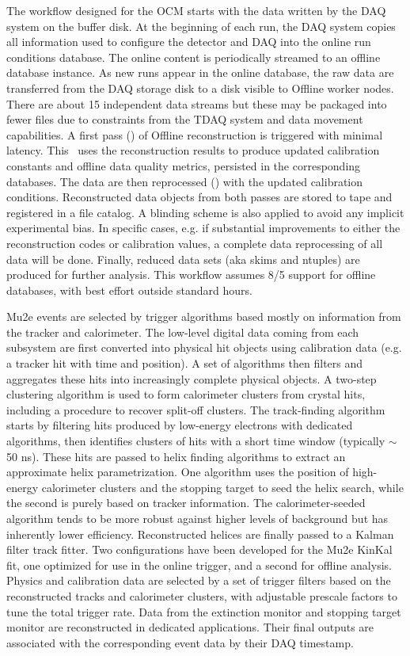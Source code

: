 The workflow designed for the OCM starts with the data written by the DAQ system on the buffer disk. At the beginning of each run, the DAQ system copies all information used to configure the detector and DAQ into the online run conditions database. The online content is periodically streamed to an offline database instance. As new runs appear in the online database, the raw data are transferred from the DAQ storage disk to a disk visible to Offline worker nodes. There are about 15 independent data streams but these may be packaged into fewer files due to constraints from the TDAQ system and data movement capabilities. A first pass (\passone) of Offline reconstruction is triggered with minimal latency. This \passone\ uses the reconstruction results to produce updated calibration constants and offline data quality metrics, persisted in the corresponding databases. The data are then reprocessed (\passtwo) with the updated calibration conditions. Reconstructed data objects from both passes are stored to tape and registered in a file catalog. A blinding scheme is also applied to avoid any implicit experimental bias. In specific cases, e.g. if substantial improvements to either the reconstruction codes or calibration values, a complete data reprocessing of all data will be done. Finally, reduced data sets (aka skims and ntuples) are produced for further analysis. This workflow assumes 8/5 support for offline databases, with best effort outside standard hours.

Mu2e events are selected by trigger algorithms based mostly on information from the tracker and calorimeter. The low-level digital data coming from each subsystem are first converted into physical hit objects using calibration data (e.g. a tracker hit with time and position). A set of algorithms then filters and aggregates these hits into increasingly complete physical objects. A two-step clustering algorithm is used to form calorimeter clusters from crystal hits, including a procedure to recover split-off clusters. The track-finding algorithm starts by filtering hits produced by low-energy electrons with dedicated algorithms, then identifies clusters of hits with a short time window (typically $\sim$50 ns). These hits are passed to helix finding algorithms to extract an approximate helix parametrization. One algorithm uses the position of high-energy calorimeter clusters and the stopping target to seed the helix search, while the second is purely based on tracker information. The calorimeter-seeded algorithm tends to be more robust against higher levels of background but has inherently lower efficiency. Reconstructed helices are finally passed to a Kalman filter track fitter. Two configurations have been developed for the Mu2e KinKal fit, one optimized for use in the online trigger, and a second for offline analysis. Physics and calibration data are selected by a set of trigger filters based on the reconstructed tracks and calorimeter clusters, with adjustable prescale factors to tune the total trigger rate. Data from the extinction monitor and stopping target monitor are reconstructed in dedicated applications. Their final outputs are associated with the corresponding event data by their DAQ timestamp. 

